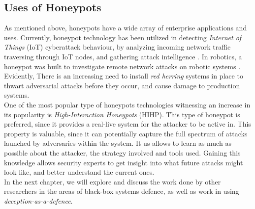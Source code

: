\documentclass[grad,lot,lof,11pt,oneside,onehalfspace]{RUthesis}
\begin{document}
\subsection{Uses of Honeypots}
As mentioned above, honeypots have a wide array of enterprise applications and uses. Currently, honeypot technology has been utilized in detecting \textit{Internet of Things} (IoT) cyberattack behaviour, by analyzing incoming network traffic  traversing through IoT nodes, and gathering attack intelligence \cite{dowling_zigbee_2017}. In robotics, a honeypot was built to investigate remote network attacks on robotic systems \cite{irvene_honeybot:_2018}. Evidently, There is an increasing need to install \textit{red herring} systems in place to thwart adversarial attacks before they occur, and cause damage to production systems.   \\
One of the most popular type of honeypots technologies witnessing an increase in its popularity is \textit{High-Interaction Honeypots} (HIHP).  This type of honeypot is preferred, since it provides a real-live system for the attacker to be active in. This property is valuable, since it can potentially capture the full spectrum of attacks launched by adversaries within the system. It us allows to learn as much as possible about the attacker, the strategy involved and tools used. Gaining this knowledge allows security experts to get insight into what future attacks might look like, and better understand the current ones. \\
\newline
In the next chapter, we will explore and discuss the work done by other researchers in the areas of black-box systems defence, as well as work in using \textit{deception-as-a-defence}. 
\end{document}
